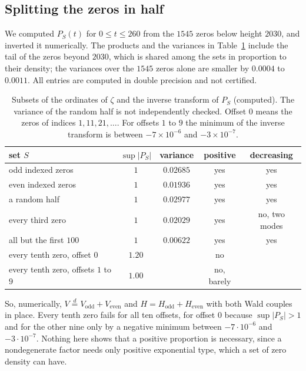 \subsection{Splitting the zeros in half}\label{ap:sec:split}

We computed $P_S(t)$ for $0\le t\le260$ from the $1545$ zeros below height $2030$, and inverted it numerically. The products and the variances in Table~\ref{ap:tab:split} include the tail of the zeros beyond $2030$, which is shared among the sets in proportion to their density; the variances over the $1545$ zeros alone are smaller by $0.0004$ to $0.0011$. All entries are computed in double precision and not certified.
\begin{table}[t]
\centering
\small
\begin{tabular}{lcccc}
\toprule
set $S$ & $\sup|P_S|$ & variance & positive & decreasing\\
\midrule
odd indexed zeros & $1$ & $0.02685$ & yes & yes\\
even indexed zeros & $1$ & $0.01936$ & yes & yes\\
a random half & $1$ & $0.02977$ & yes & yes\\
every third zero & $1$ & $0.02029$ & yes & no, two modes\\
all but the first $100$ & $1$ & $0.00622$ & yes & yes\\
every tenth zero, offset $0$ & $1.20$ & & no & \\
every tenth zero, offsets $1$ to $9$ & $1.00$ & & no, barely & \\
\bottomrule
\end{tabular}
\caption{Subsets of the ordinates of $\zeta$ and the inverse transform of $P_S$ (computed). The variance of the random half is not independently checked. Offset $0$ means the zeros of indices $1,11,21,\dots$. For offsets $1$ to $9$ the minimum of the inverse transform is between $-7\times10^{-6}$ and $-3\times10^{-7}$.}\label{ap:tab:split}
\end{table}
So, numerically, $V\overset{d}{=}V_{\mathrm{odd}}+V_{\mathrm{even}}$ and $H=H_{\mathrm{odd}}+H_{\mathrm{even}}$ with both Wald couples in place. Every tenth zero fails for all ten offsets, for offset $0$ because $\sup|P_S|>1$ and for the other nine only by a negative minimum between $-7\cdot10^{-6}$ and $-3\cdot10^{-7}$. Nothing here shows that a positive proportion is necessary, since a nondegenerate factor needs only positive exponential type, which a set of zero density can have.
